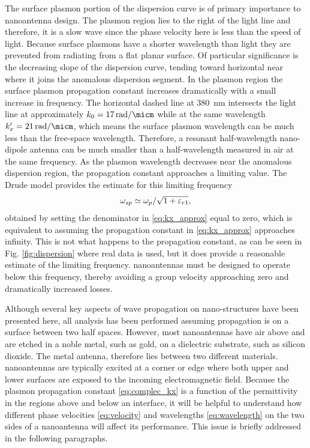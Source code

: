 \documentclass[11pt]{article}
\begin{document}
The surface plasmon portion of the dispersion curve is of primary importance to nanoantenna design. The plasmon region lies to the right of the light line and therefore, it is a slow wave since the phase velocity here is less than the speed of light. Because surface plasmons have a shorter wavelength than light they are prevented from radiating from a flat planar surface. Of particular significance is the decreasing slope of the dispersion curve, tending toward horizontal near where it joins the anomalous dispersion segment. In the plasmon region the surface plasmon propagation constant increases dramatically with a small increase in frequency. The horizontal dashed line at \SI{380}{\nm} intersects the light line at approximately $k_0 = \SI{17}{\radian \per \micm}$ while at the same wavelength $k_x' = \SI{21}{\radian \per \micm}$, which means the surface plasmon wavelength can be much less than the free-space wavelength. Therefore, a resonant half-wavelength nano-dipole antenna can be much smaller than a half-wavelength measured in air at the same frequency. As the plasmon wavelength decreases near the anomalous dispersion region, the propagation constant approaches a limiting value. The Drude model provides the estimate for this limiting frequency
%
\begin{equation}
  \omega_{sp} \simeq \omega_p/\sqrt{1 + \varepsilon_{r1}},
  \label{eq:apprx_plasma_freq}
\end{equation}
%
obtained by setting the denominator in \eqref{eq:kx_approx} equal to zero, which is equivalent to assuming the propagation constant in \eqref{eq:kx_approx} approaches infinity. This is not what happens to the propagation constant, as can be seen in Fig. \ref{fig:dispersion} where real data is used, but it does provide a reasonable estimate of the limiting frequency. nanoantennas must be designed to operate below this frequency, thereby avoiding a group velocity approaching zero and dramatically increased losses.

Although several key aspects of wave propagation on nano-structures have been presented here, all analysis has been performed assuming propagation is on a surface between two half spaces. However, most nanoantennas have air above and are etched in a noble metal, such as gold, on a dielectric substrate, such as silicon dioxide. The metal antenna, therefore lies between two different materials. nanoantennas are typically excited at a corner or edge where both upper and lower surfaces are exposed to the incoming electromagnetic field. Because the plasmon propagation constant \eqref{eq:complec_kx} is a function of the permittivity in the regions above and below an interface, it will be helpful to understand how different phase velocities \eqref{eq:velocity} and wavelengths \eqref{eq:wavelength} on the two sides of a nanoantenna will affect its performance. This issue is briefly addressed in the following paragraphs.
\end{document}
